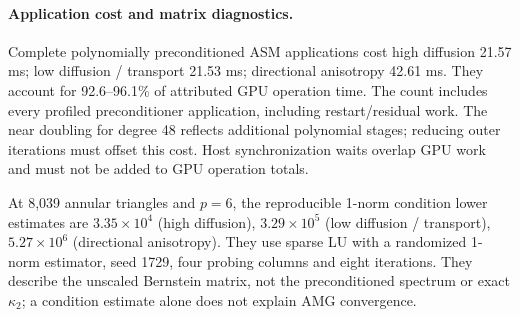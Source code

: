 \paragraph{Application cost and matrix diagnostics.}
Complete polynomially preconditioned ASM applications cost high diffusion 21.57 ms; low diffusion / transport 21.53 ms; directional anisotropy 42.61 ms. They account for 92.6--96.1\% of attributed GPU operation time. The count includes every profiled preconditioner application, including restart/residual work. The near doubling for degree 48 reflects additional polynomial stages; reducing outer iterations must offset this cost. Host synchronization waits overlap GPU work and must not be added to GPU operation totals.
\begin{table}[!htbp]
 \centering\small
 \setlength{\tabcolsep}{4pt}
 
 \caption{Separate preconditioner profiles on 99,984 annular triangles at
 $p=6$. ASM and $p$MG--AMG report means of ten warmed applications;
 AMGX reports immediate-preconditioner event means over two instrumented
 solves. The instrumentation protocols differ, so these numbers explain
 cost but do not replace the uninstrumented solve ranking. GPU denotes the
 fraction of attributed operation time; this fraction is unavailable for AMGX.}
 \label{tab:adr-oscillatory-applications}
\end{table}
At 8,039 annular triangles and $p=6$, the reproducible 1-norm condition lower estimates are $3.35\times10^{4}$ (high diffusion), $3.29\times10^{5}$ (low diffusion / transport), $5.27\times10^{6}$ (directional anisotropy). They use sparse LU with a randomized 1-norm estimator, seed 1729, four probing columns and eight iterations. They describe the unscaled Bernstein matrix, not the preconditioned spectrum or exact $\kappa_2$; a condition estimate alone does not explain AMG convergence.

